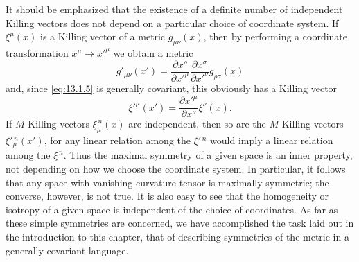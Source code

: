 It should be emphasized that the existence of a definite number of independent
Killing vectors does not depend on a particular choice of coordinate system.
If \(\xi^\mu(x)\) is a Killing vector of a metric \(g_{\mu\nu}(x)\), then
by performing a coordinate transformation \(x^\mu\longrightarrow x'^\mu\)
we obtain a metric
\[
  g'_{\mu\nu}(x')
  =
  \frac{\partial x^\rho}{\partial x'^\mu}
  \frac{\partial x^\sigma}{\partial x'^\nu}
  g_{\rho\sigma}(x)
\]
and, since \eqref{eq:13.1.5} is generally covariant, this obviously has a
Killing vector
\[
  \xi'^\mu(x')
  =
  \frac{\partial x'^\mu}{\partial x^\nu}\xi^\nu(x).
\]
If \(M\) Killing vectors \(\xi_\mu^{\,n}(x)\) are independent, then so are
the \(M\) Killing vectors \(\xi'{}_\mu^{\,n}(x')\), for any linear relation
among the \(\xi'{}^{\,n}\) would imply a linear relation among the
\(\xi^{\,n}\). Thus the maximal symmetry of a given space is an inner
property, not depending on how we choose the coordinate system. In particular,
it follows that any space with vanishing curvature tensor is maximally
symmetric; the converse, however, is not true. It is also easy to see that the
homogeneity or isotropy of a given space is independent of the choice of
coordinates. As far as these simple symmetries are concerned, we have
accomplished the task laid out in the introduction to this chapter, that of
describing symmetries of the metric in a generally covariant language.
